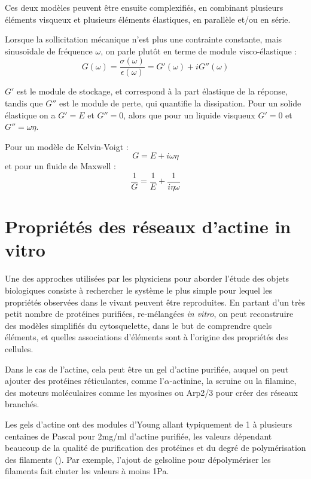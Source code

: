Ces deux modèles peuvent être ensuite complexifiés, en combinant plusieurs éléments visqueux et plusieurs éléments élastiques, en parallèle et/ou en série. 

Lorsque la sollicitation mécanique n'est plus une contrainte constante, mais sinusoïdale de fréquence $\omega$, on parle plutôt en terme de module visco-élastique : 
$$G(\omega) = \frac{\sigma(\omega)}{\epsilon(\omega)} = G'(\omega)+iG''(\omega)$$

$G'$ est le module de stockage, et correspond à la part élastique de la réponse, tandis que $G''$ est le module de perte, qui quantifie la dissipation. Pour un solide élastique on a $G'=E$ et $G''=0$, alors que pour un liquide visqueux $G'=0$ et $G''=\omega \eta$. 

Pour un modèle de Kelvin-Voigt : 
$$ G=E+ i \omega \eta$$
et pour un fluide de Maxwell : 
$$ \frac{1}{G} = \frac{1}{E} + \frac{1}{i \eta \omega}$$


\section{Propriétés des réseaux d'actine in vitro}

Une des approches utilisées par les physiciens pour aborder l'étude des objets biologiques consiste à rechercher le système le plus simple pour lequel les propriétés observées dans le vivant peuvent être reproduites. 
En partant d'un très petit nombre de protéines purifiées, re-mélangées \textit{in vitro}, on peut reconstruire des modèles simplifiés du cytosquelette, dans le but de comprendre quels éléments, et quelles associations d'éléments sont à l'origine des propriétés des cellules. 

Dans le cas de l'actine, cela peut être un gel d'actine purifiée, auquel on peut ajouter des protéines réticulantes, comme l'$\alpha$-actinine, la scruine ou la filamine, des moteurs moléculaires comme les myosines ou Arp2/3 pour créer des réseaux branchés. 

Les gels d'actine ont des modules d'Young allant typiquement de 1 à plusieurs centaines de Pascal pour 2mg/ml d'actine purifiée, les valeurs dépendant beaucoup de la qualité de purification des protéines et du degré de polymérisation des filaments (\cite{janmey_mechanical_1994}). Par exemple, l'ajout de gelsoline pour dépolymériser les filaments fait chuter les valeurs à moins 1Pa. 


